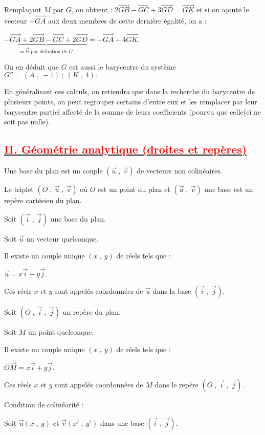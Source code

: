 \documentclass{article}
\begin{document}
		Remplaçant $M$ par $G$, on obtient : $2\overrightarrow{GB}-\overrightarrow{GC}+3\overrightarrow{GD}=\overrightarrow{GK}$ et si on ajoute le vecteur $-\overrightarrow{GA}$ aux deux membres de cette dernière égalité, on a :
		
		$\underbrace{-\overrightarrow{GA}+2\overrightarrow{GB}-\overrightarrow{GC}+2\overrightarrow{GD}}_{=\overrightarrow{0}\text{ par définition de }G}=-\overrightarrow{GA}+4\overrightarrow{GK}.$
		
		On en déduit que $G$ est aussi le barycentre du système $G''={(A\;,\ -1)\ ;\ (K\;,\ 4)}.$
		
		En généralisant ces calculs, on retiendra que dans la recherche du barycentre de plusieurs points, on peut regrouper certains d'entre eux et les remplacer par leur barycentre partiel affecté de la somme de leurs coefficients (pourvu que celle(ci ne soit pas nulle).
		

\subsection*{\underline{\textbf{\textcolor{red}{II. Géométrie analytique (droites et repères)}}}}
		Une base du plan est un couple $(\vec{u}\;,\ \vec{v})$ de vecteurs non colinéaires.
		
		Le triplet $(O\;,\ \vec{u}\;,\ \vec{v})$ où $O$ est un point du plan et $(\vec{u}\;,\ \vec{v})$ une base est un repère cartésien du plan.
		
		Soit $(\vec{i}\;,\ \vec{j})$ une base du plan.
		
		Soit $\vec{u}$ un vecteur quelconque.
		
		Il existe un couple unique $(x\;,\ y)$ de réels tels que :
		
		$\vec{u}=x\vec{i}+y\vec{j}.$
		
		Ces réels $x$ et $y$ sont appelés coordonnées de $\vec{u}$ dans la base $(\vec{i}\;,\ \vec{j}).$
		
		Soit $(O\;,\ \vec{i}\;,\ \vec{j})$ un repère du plan.
		
		Soit $M$ un point quelconque.
		
		Il existe un couple unique $(x\;,\ y)$ de réels tels que :
		
		$\overrightarrow{OM}=x\vec{i}+y\vec{j}.$
		
		Ces réels $x$ et $y$ sont appelés coordonnées de $M$ dans le repère $(O\;,\ \vec{i}\;,\ \vec{j}).$
		
		
		Condition de colinéarité :
		
		Soit $\vec{u}(x\;,\ y)$ et $\vec{v}(x'\;,\ y')$ dans une base $(\vec{i}\;,\ \vec{j}).$
		
\end{document}
